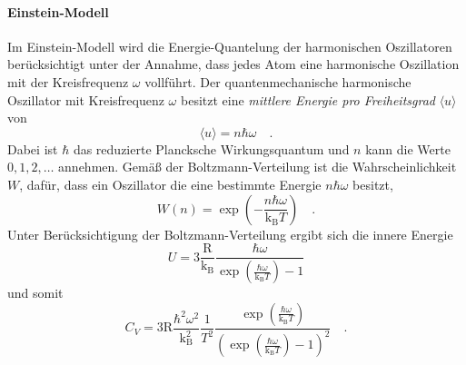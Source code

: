 \paragraph{Einstein-Modell}
	Im Einstein-Modell wird die Energie-Quantelung der harmonischen 
	Oszillatoren berücksichtigt unter der Annahme, dass jedes Atom eine 
	harmonische Oszillation mit der Kreisfrequenz $\omega$ vollführt. 
	Der quantenmechanische harmonische 
	Oszillator mit Kreisfrequenz $\omega$ besitzt eine 
	\textit{mittlere Energie pro Freiheitsgrad} 
	$\langle u \rangle$ von 
	\begin{equation}
	\langle u \rangle = n \hbar \omega \quad .
	\end{equation}
	Dabei ist $\hbar$ das reduzierte Plancksche Wirkungsquantum und 
	$n$ kann die Werte $0,1,2,\ldots$ annehmen. Gemäß der 
	Boltzmann-Verteilung ist die Wahrscheinlichkeit $W$, dafür, dass ein 
	Oszillator die eine bestimmte Energie $n\hbar \omega$ besitzt, 
	\begin{equation}
	W(n) = \exp\left(-\frac{n \hbar \omega}{\text{k}_\text{B}T}\right)
	\quad .
	\end{equation}
	Unter Berücksichtigung der Boltzmann-Verteilung ergibt sich die innere 
	Energie 
	\begin{equation}
	U=3 \frac{\text{R}}{\text{k}_\text{B}} \frac{\hbar \omega}{
	\exp\left(\frac{\hbar \omega}{\text{k}_\text{B} T}\right)-1} 
	\end{equation}
	und somit 
	\begin{equation}
	C_V = 3 \text{R} \frac{\hbar^2 \omega^2}{\text{k}_\text{B}^2} 
	\frac{1}{T^2} \frac{\exp\left(\frac{\hbar \omega}{\text{k}_\text{B} 
	T}\right)}{\left(\exp\left(\frac{\hbar \omega}{\text{k}_\text{B} 
	T}\right)-1\right)^2} \quad .
	\label{eq:theorie:C_Einstein}
	\end{equation}
	
